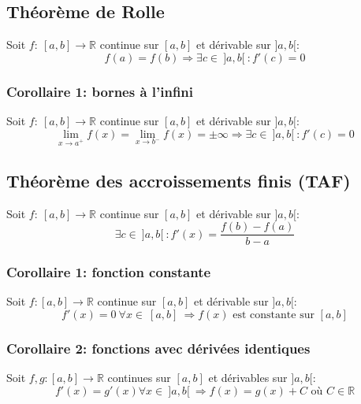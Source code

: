 \documentclass{article}
\begin{document}
\subsection{Théorème de Rolle}
Soit \(f : \ [a, b] \to \mathbb{R}\) continue sur \([a, b]\) et dérivable sur \(]a, b[\):
\begin{equation*}
	f(a) = f(b) \Rightarrow \exists c \in \ ]a, b[ \ : f'(c) = 0
\end{equation*}

\subsubsection{Corollaire 1: bornes à l'infini}
Soit \(f : \ [a, b] \to \mathbb{R}\) continue sur \([a, b]\) et dérivable sur \(]a, b[\):
\begin{equation*}
	\lim\limits_{x \to a^+} f(x) = \lim\limits_{x \to b^-} f(x) = \pm \infty \Rightarrow \exists c \in \ ]a, b[ \ : f'(c) = 0
\end{equation*}

\subsection{Théorème des accroissements finis (TAF)}
Soit \(f : \ [a, b] \to \mathbb{R}\) continue sur \([a, b]\) et dérivable sur \(]a, b[\):
\begin{equation*}
	\exists c \in \ ]a, b[ \ : f'(x) = \frac{f(b) - f(a)}{b - a}
\end{equation*}

\subsubsection{Corollaire 1: fonction constante}
Soit \(f : [a, b] \to \mathbb{R}\) continue sur \([a, b]\) et dérivable sur \(]a, b[\):
\begin{equation*}
	f'(x) = 0 \ \forall x \in \ [a, b] \ \Rightarrow f(x) \text{ est constante sur } [a, b]
\end{equation*}

\subsubsection{Corollaire 2: fonctions avec dérivées identiques}
Soit \(f, g : [a, b] \to \mathbb{R}\) continues sur \([a, b]\) et dérivables sur \(]a, b[\):
\begin{equation*}
	f'(x) = g'(x) \forall x \in \ ]a, b[ \ \Rightarrow f(x) = g(x) + C \text{ où } C \in \mathbb{R}
\end{equation*}
\end{document}
